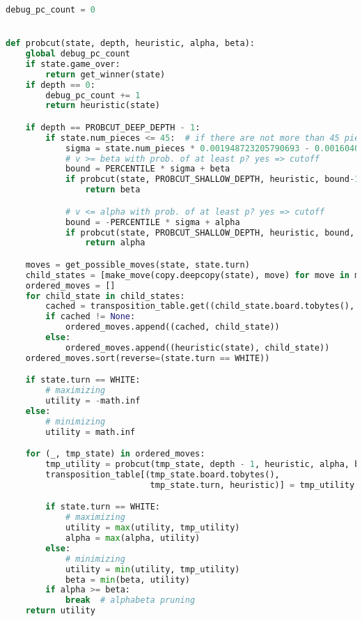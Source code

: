 \begin{lstlisting}[language=Python]
debug_pc_count = 0


def probcut(state, depth, heuristic, alpha, beta):
    global debug_pc_count
    if state.game_over:
        return get_winner(state)
    if depth == 0:
        debug_pc_count += 1
        return heuristic(state)

    if depth == PROBCUT_DEEP_DEPTH - 1:
        if state.num_pieces <= 45:  # if there are not more than 45 pieces on the board sigma can be calculated based on statistic values with the combined_heuristic
            sigma = state.num_pieces * 0.001948723205790693 - 0.001604049443613545
            # v >= beta with prob. of at least p? yes => cutoff
            bound = PERCENTILE * sigma + beta
            if probcut(state, PROBCUT_SHALLOW_DEPTH, heuristic, bound-1, bound) >= bound:
                return beta

            # v <= alpha with prob. of at least p? yes => cutoff
            bound = -PERCENTILE * sigma + alpha
            if probcut(state, PROBCUT_SHALLOW_DEPTH, heuristic, bound, bound+1) <= bound:
                return alpha

    moves = get_possible_moves(state, state.turn)
    child_states = [make_move(copy.deepcopy(state), move) for move in moves]
    ordered_moves = []
    for child_state in child_states:
        cached = transposition_table.get((child_state.board.tobytes(), child_state.turn, heuristic), None)
        if cached != None:
            ordered_moves.append((cached, child_state))
        else:
            ordered_moves.append((heuristic(state), child_state))
    ordered_moves.sort(reverse=(state.turn == WHITE))

    if state.turn == WHITE:
        # maximizing
        utility = -math.inf
    else:
        # minimizing
        utility = math.inf

    for (_, tmp_state) in ordered_moves:
        tmp_utility = probcut(tmp_state, depth - 1, heuristic, alpha, beta)
        transposition_table[(tmp_state.board.tobytes(),
                             tmp_state.turn, heuristic)] = tmp_utility

        if state.turn == WHITE:
            # maximizing
            utility = max(utility, tmp_utility)
            alpha = max(alpha, utility)
        else:
            # minimizing
            utility = min(utility, tmp_utility)
            beta = min(beta, utility)
        if alpha >= beta:
            break  # alphabeta pruning
    return utility
\end{lstlisting}

